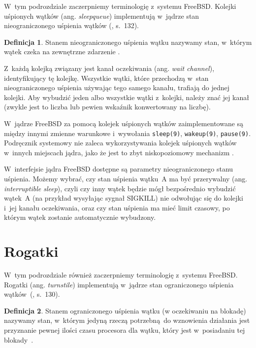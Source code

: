 \documentclass[shortabstract]{iithesis}
\theoremstyle{definition} \newtheorem*{definition}{Definicja}
\theoremstyle{definition} \newtheorem*{example}{Przykład}
\theoremstyle{definition} \newtheorem*{remark}{Uwaga}
\begin{document}
W~tym podrozdziale zaczerpniemy terminologię z~systemu FreeBSD.
Kolejki uśpionych wątków (ang. \textit{sleepqueue}) implementują w~jądrze stan nieograniczonego uśpienia
wątków (\cite{bib:freebsd}, s.~132).
\begin{definition}
Stanem nieograniczonego uśpienia wątku nazywamy stan, w~którym wątek czeka na zewnętrzne
zdarzenie \cite{freebsd:locking}.
\end{definition}

Z~każdą kolejką związany jest kanał oczekiwania (ang.
\textit{wait channel}), identyfikujący tę kolejkę. Wszystkie wątki, które przechodzą w~stan nieograniczonego
uśpienia używając tego samego kanału, trafiają do jednej kolejki. Aby wybudzić jeden albo wszystkie wątki
z~kolejki, należy znać jej kanał (zwykle jest to liczba lub pewien wskaźnik konwertowany na liczbę).

W~jądrze FreeBSD za pomocą kolejek uśpionych wątków zaimplementowane są między innymi zmienne warunkowe i~wywołania
\texttt{sleep(9)}, \texttt{wakeup(9)}, \texttt{pause(9)}.
Podręcznik systemowy nie zaleca wykorzystywania kolejek uśpionych wątków w~innych miejscach jądra,
jako że jest to zbyt niskopoziomowy mechanizm \cite{freebsd:sleepqueue}.

W~interfejsie jądra FreeBSD dostępne są parametry nieograniczonego stanu uśpienia. Możemy wybrać, czy stan uśpienia
wątku~A ma być przerywalny
(ang. \textit{interruptible sleep}), czyli czy inny wątek będzie mógł bezpośrednio wybudzić wątek~A (na przykład
wysyłając sygnał SIGKILL) nie odwołując się do kolejki i~jej kanału oczekiwania, oraz czy stan uśpienia
ma mieć limit czasowy, po którym wątek zostanie automatycznie wybudzony.

\section{Rogatki}

W~tym podrozdziale również zaczerpniemy terminologię z~systemu FreeBSD.
Rogatki (ang. \textit{turnstile}) implementują w~jądrze stan ograniczonego uśpienia
wątków~(\cite{bib:freebsd}, s.~130).

\begin{definition}
Stanem ograniczonego uśpienia wątku (w oczekiwaniu na blokadę) nazywamy stan, w~którym jedyną rzeczą
potrzebną do wznowienia działania jest przyznanie pewnej ilości czasu procesora dla wątku, który
jest w~posiadaniu tej blokady~\cite{freebsd:locking}.
\end{definition}
\end{document}
